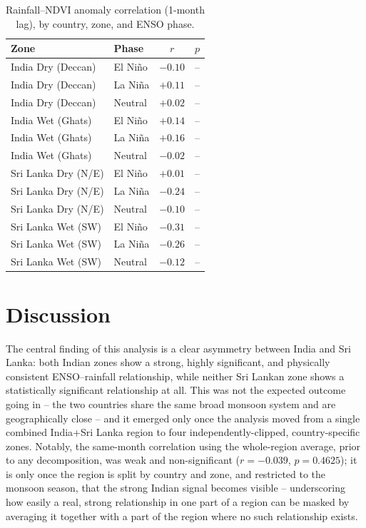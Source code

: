 \documentclass{article}
\begin{document}
\begin{table}[h]
\centering
\caption{Rainfall--NDVI anomaly correlation (1-month lag), by country, zone, and ENSO
phase.}
\label{tab:ndvi}
\begin{tabular}{llcc}
\toprule
Zone & Phase & $r$ & $p$ \\
\midrule
India Dry (Deccan) & El Ni\~{n}o & $-0.10$ & -- \\
India Dry (Deccan) & La Ni\~{n}a & $+0.11$ & -- \\
India Dry (Deccan) & Neutral      & $+0.02$ & -- \\
India Wet (Ghats)  & El Ni\~{n}o & $+0.14$ & -- \\
India Wet (Ghats)  & La Ni\~{n}a & $+0.16$ & -- \\
India Wet (Ghats)  & Neutral      & $-0.02$ & -- \\
Sri Lanka Dry (N/E) & El Ni\~{n}o & $+0.01$ & -- \\
Sri Lanka Dry (N/E) & La Ni\~{n}a & $-0.24$ & -- \\
Sri Lanka Dry (N/E) & Neutral      & $-0.10$ & -- \\
Sri Lanka Wet (SW)  & El Ni\~{n}o & $-0.31$ & -- \\
Sri Lanka Wet (SW)  & La Ni\~{n}a & $-0.26$ & -- \\
Sri Lanka Wet (SW)  & Neutral      & $-0.12$ & -- \\
\bottomrule
\end{tabular}
\end{table}

\section{Discussion}

The central finding of this analysis is a clear asymmetry between India and Sri Lanka:
both Indian zones show a strong, highly significant, and physically consistent
ENSO--rainfall relationship, while neither Sri Lankan zone shows a statistically
significant relationship at all. This was not the expected outcome going in --
the two countries share the same broad monsoon system and are geographically close --
and it emerged only once the analysis moved from a single combined India+Sri Lanka
region to four independently-clipped, country-specific zones. Notably, the same-month
correlation using the whole-region average, prior to any decomposition, was weak and
non-significant ($r=-0.039$, $p=0.4625$); it
is only once the region is split by country and zone, and restricted to the monsoon
season, that the strong Indian signal becomes visible -- underscoring how easily a
real, strong relationship in one part of a region can be masked by averaging it
together with a part of the region where no such relationship exists.
\end{document}
